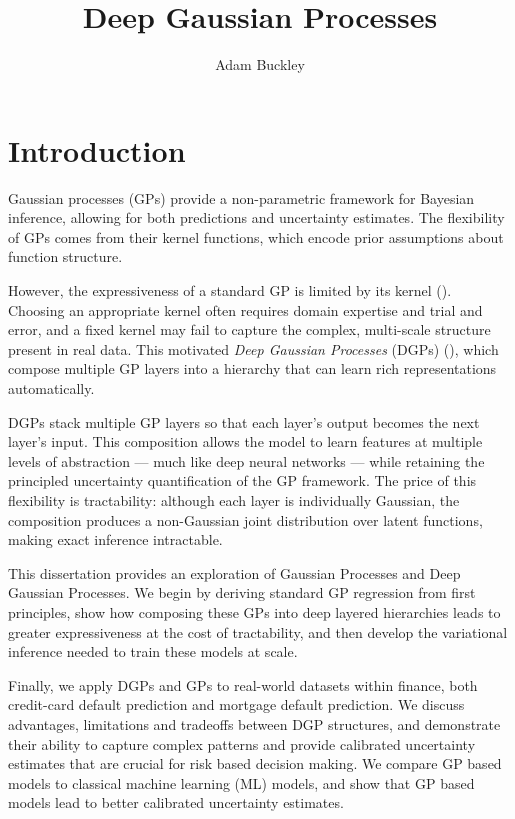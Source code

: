 \documentclass[
  letterpaper,
  DIV=11,
  numbers=noendperiod]{scrartcl}
\title{Deep Gaussian Processes}
\author{Adam Buckley}
\date{}
\renewcommand*\contentsname{Table of contents}
\newcommand\contentsname{Table of contents}
\begin{document}
\maketitle

\renewcommand*\contentsname{Table of contents}
{
\hypersetup{linkcolor=}
\setcounter{tocdepth}{2}
\tableofcontents
}

\section{Introduction}\label{introduction}

Gaussian processes (GPs) provide a non-parametric framework for Bayesian
inference, allowing for both predictions and uncertainty estimates. The
flexibility of GPs comes from their kernel functions, which encode prior
assumptions about function structure.

However, the expressiveness of a standard GP is limited by its kernel
(). Choosing an
appropriate kernel often requires domain expertise and trial and error,
and a fixed kernel may fail to capture the complex, multi-scale
structure present in real data. This motivated \emph{Deep Gaussian
Processes} (DGPs) (), which compose multiple GP layers into a hierarchy that
can learn rich representations automatically.

DGPs stack multiple GP layers so that each layer's output becomes the
next layer's input. This composition allows the model to learn features
at multiple levels of abstraction --- much like deep neural networks ---
while retaining the principled uncertainty quantification of the GP
framework. The price of this flexibility is tractability: although each
layer is individually Gaussian, the composition produces a non-Gaussian
joint distribution over latent functions, making exact inference
intractable.

This dissertation provides an exploration of Gaussian Processes and Deep
Gaussian Processes. We begin by deriving standard GP regression from
first principles, show how composing these GPs into deep layered
hierarchies leads to greater expressiveness at the cost of tractability,
and then develop the variational inference needed to train these models
at scale.

Finally, we apply DGPs and GPs to real-world datasets within finance,
both credit-card default prediction and mortgage default prediction. We
discuss advantages, limitations and tradeoffs between DGP structures,
and demonstrate their ability to capture complex patterns and provide
calibrated uncertainty estimates that are crucial for risk based
decision making. We compare GP based models to classical machine
learning (ML) models, and show that GP based models lead to better
calibrated uncertainty estimates.
\end{document}
